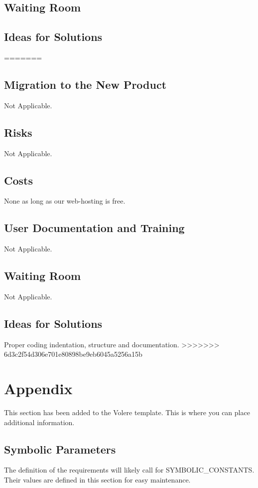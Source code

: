 \documentclass[12pt, titlepage]{article}
\begin{document}
    	\subsection{Waiting Room}

    	\subsection{Ideas for Solutions}
=======

    	\subsection{Migration to the New Product}
    	Not Applicable.

    	\subsection{Risks}
    	Not Applicable.

    	\subsection{Costs}
    	None as long as our web-hosting is free.

    	\subsection{User Documentation and Training}
    	Not Applicable.

    	\subsection{Waiting Room}
    	Not Applicable.

    	\subsection{Ideas for Solutions}
    	Proper coding indentation, structure and documentation.
>>>>>>> 6d3c2f54d306e701e80898be9eb6045a5256a15b

	\newpage
    

    


    \section{Appendix}

    This section has been added to the Volere template.  This is where you can place
    additional information.

    \subsection{Symbolic Parameters}

    The definition of the requirements will likely call for SYMBOLIC\_CONSTANTS.
    Their values are defined in this section for easy maintenance.
\end{document}

